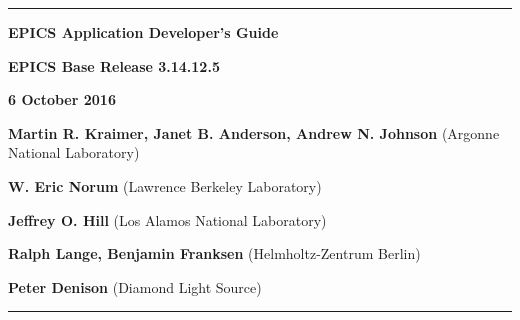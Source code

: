 \hrule

\vspace{1in}

\noindent \Huge \textbf{EPICS Application Developer's Guide}

\vspace{0.5in}

\noindent \Large \textbf{EPICS Base Release 3.14.12.5}

\noindent \textbf{6 October 2016}

\vspace{0.5in}

\normalsize
\noindent \textbf{Martin R. Kraimer, Janet B. Anderson, Andrew N. Johnson} (Argonne National Laboratory)

\noindent \textbf{W. Eric Norum} (Lawrence Berkeley Laboratory)

\noindent \textbf{Jeffrey O. Hill} (Los Alamos National Laboratory)

\noindent \textbf{Ralph Lange, Benjamin Franksen} (Helmholtz-Zentrum Berlin)

\noindent \textbf{Peter Denison} (Diamond Light Source)

\vspace{1in}
\hrule
